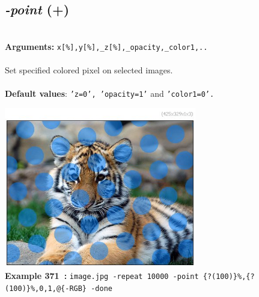 \documentclass[a4paper,11pt,twoside]{book}
\begin{document}
\subsection{\emph{-point} (+)}\vspace*{-0.5em}
~\\\textbf{Arguments: } 
{\small \texttt{x[\%],y[\%],\_z[\%],\_opacity,\_color1,..}}\\~\\
Set specified colored pixel on selected images.
~\\~\\\textbf{Default values}: {\small \texttt{'z=0', 'opacity=1'} and \texttt{'color1=0'.}}
\begin{center}\includegraphics[keepaspectratio=true,height=7cm,width=\textwidth]{img/gmic_def371.jpg}\\
{\footnotesize \textbf{Example 371~:} \texttt{image.jpg -repeat 10000 -point \{?(100)\}\%,\{?(100)\}\%,0,1,@\{-RGB\} -done}}
\end{center}
\end{document}
